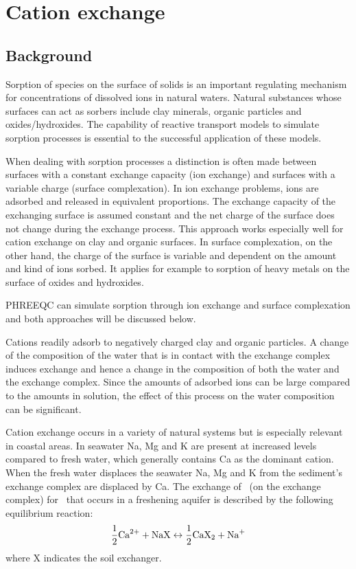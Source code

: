 \normalsize\large\newpage
\chapter{Cation exchange}
\def\shorttitle{Ion exchange} %
\section{Background}

Sorption of species on the surface of solids is an important regulating mechanism for concentrations of dissolved ions in natural waters. Natural substances whose surfaces can act as sorbers include clay minerals, organic particles and oxides/hydroxides. The capability of reactive transport models to simulate sorption processes is essential to the successful application of these models.

When dealing with sorption processes a distinction is often made between surfaces with a constant exchange capacity (ion exchange) and surfaces with a variable charge (surface complexation). In ion exchange problems, ions are adsorbed and released in equivalent proportions. The exchange capacity of the exchanging surface is assumed constant and the net charge of the surface does not change during the exchange process. This approach works especially well for cation exchange on clay and organic surfaces. In surface complexation, on the other hand, the charge of the surface is variable and dependent on the amount and kind of ions sorbed. It applies for example to sorption of heavy metals on the surface of oxides and hydroxides. 

PHREEQC can simulate sorption through ion exchange and surface complexation and both approaches will be discussed below.

Cations readily adsorb to negatively charged clay and organic particles. A change of the composition of the water that is in contact with the exchange complex induces exchange and hence a change in the composition of both the water and the exchange complex. Since the amounts of adsorbed ions can be large compared to the amounts in solution, the effect of this process on the water composition can be significant.

Cation exchange occurs in a variety of natural systems but is especially relevant in coastal areas. In seawater Na, Mg and K are present at increased levels compared to fresh water, which generally contains Ca as the dominant cation. When the fresh water displaces the seawater Na, Mg and K from the sediment's exchange complex are displaced by Ca. The exchange of \na\ (on the exchange complex) for \ca\ that occurs in a freshening aquifer is described by the following equilibrium reaction:
\begin{equation}
\frac{1}{2} \text{Ca}^{2+} + \text{NaX} \leftrightarrow \frac{1}{2} \text{CaX}_{2} + \text{Na}^{+}
\end{equation}
where X indicates the soil exchanger.

